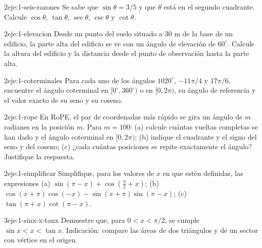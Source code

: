 \begin{ejercicio}{2}{eje:1-seis-razones}
Se sabe que $\sin\theta=3/5$ y que $\theta$ está en el segundo cuadrante. Calcule $\cos\theta$, $\tan\theta$, $\sec\theta$, $\csc\theta$ y $\cot\theta$.
\end{ejercicio}

\begin{ejercicio}{2}{eje:1-elevacion}
Desde un punto del suelo situado a 30 m de la base de un edificio, la parte alta del edificio se ve con un ángulo de elevación de $60^{\circ}$. Calcule la altura del edificio y la distancia desde el punto de observación hasta la parte alta.
\end{ejercicio}

\begin{ejercicio}{2}{eje:1-coterminales}
Para cada uno de los ángulos $1020^{\circ}$, $-11\pi/4$ y $17\pi/6$, encuentre el ángulo coterminal en $[0^{\circ},360^{\circ})$ o en $[0,2\pi)$, su ángulo de referencia y el valor exacto de su seno y su coseno.
\end{ejercicio}

\begin{ejercicio}{2}{eje:1-rope}
En RoPE, el par de coordenadas más rápido se gira un ángulo de $m$ radianes en la posición $m$. Para $m=100$: (a) calcule cuántas vueltas completas se han dado y el ángulo coterminal en $[0,2\pi)$; (b) indique el cuadrante y el signo del seno y del coseno; (c) ¿cada cuántas posiciones se repite exactamente el ángulo? Justifique la respuesta.
\end{ejercicio}

\begin{ejercicio}{2}{eje:1-simplificar}
Simplifique, para los valores de $x$ en que estén definidas, las expresiones (a) $\sin(\pi-x)+\cos(\tfrac{\pi}{2}+x)$; (b) $\cos(x+\pi)\cos(-x)-\sin(x+\pi)\sin(\pi-x)$; (c) $\tan(\pi+x)\cot(\pi-x)$.
\end{ejercicio}

\begin{ejercicio}{3}{eje:1-sinx-x-tanx}
Demuestre que, para $0<x<\pi/2$, se cumple $\sin x<x<\tan x$. Indicación: compare las áreas de dos triángulos y de un sector con vértice en el origen.
\end{ejercicio}

